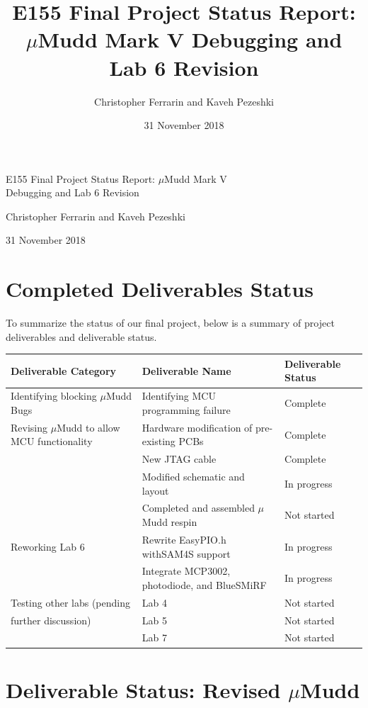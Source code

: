 \documentclass[12pt]{article}
\title{E155 Final Project Status Report: $\mu$Mudd Mark V Debugging and Lab 6 Revision}
\author{Christopher Ferrarin and Kaveh Pezeshki}
\date{31 November 2018}
\begin{document}
	\begin{LARGE}
	\noindent
		E155 
		Final 
		Project 
		Status
		Report: 
		$\mu$Mudd 
		Mark V \\
		Debugging 
		and 
		Lab 
		6 
		Revision
	\end{LARGE}

	\vspace{0.2cm}
	
	\begin{large}
	Christopher Ferrarin and Kaveh Pezeshki
	
	31 November 2018
	\end{large}

\section{Completed Deliverables Status}
To summarize the status of our final project, below is a summary of project deliverables and deliverable status.

	\begin{center}
	\begin{tabular}{p{6cm}p{5cm}p{4cm}}
	Deliverable Category & Deliverable Name & Deliverable Status\\
	\hline
	Identifying blocking $\mu$Mudd Bugs & Identifying MCU programming failure & Complete \\
	Revising $\mu$Mudd to allow MCU functionality & Hardware modification of pre-existing PCBs & Complete \\
	& New JTAG cable & Complete \\
	& Modified schematic and layout & In progress \\
	& Completed and assembled $\mu$Mudd respin & Not started \\
	Reworking Lab 6 & Rewrite EasyPIO.h withSAM4S support & In progress \\
	& Integrate MCP3002, photodiode, and BlueSMiRF & In progress \\
	Testing other labs (pending& Lab 4 & Not started \\
	 further discussion)& Lab 5 & Not started \\
	& Lab 7 & Not started
	\end{tabular}
	\end{center}

\section{Deliverable Status: Revised $\mu$Mudd}
\end{document}
